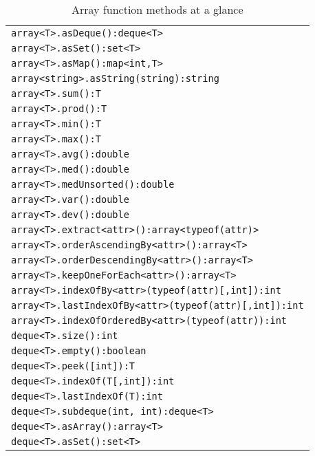 \begin{table}[htbp]
\begin{tabular}{|l|}
\texttt{array<T>.asDeque():deque<T>}\\
\texttt{array<T>.asSet():set<T>}\\
\texttt{array<T>.asMap():map<int,T>}\\
\texttt{array<string>.asString(string):string}\\
\hline
\texttt{array<T>.sum():T}\\
\texttt{array<T>.prod():T}\\
\texttt{array<T>.min():T}\\
\texttt{array<T>.max():T}\\
\texttt{array<T>.avg():double}\\
\texttt{array<T>.med():double}\\
\texttt{array<T>.medUnsorted():double}\\
\texttt{array<T>.var():double}\\
\texttt{array<T>.dev():double}\\
\hline
\texttt{array<T>.extract<attr>():array<typeof(attr)>}\\
\texttt{array<T>.orderAscendingBy<attr>():array<T>}\\
\texttt{array<T>.orderDescendingBy<attr>():array<T>}\\
\texttt{array<T>.keepOneForEach<attr>():array<T>}\\
\texttt{array<T>.indexOfBy<attr>(typeof(attr)[,int]):int}\\
\texttt{array<T>.lastIndexOfBy<attr>(typeof(attr)[,int]):int}\\
\texttt{array<T>.indexOfOrderedBy<attr>(typeof(attr)):int}\\
\hline
\texttt{deque<T>.size():int}\\
\texttt{deque<T>.empty():boolean}\\
\texttt{deque<T>.peek([int]):T}\\
\texttt{deque<T>.indexOf(T[,int]):int}\\
\texttt{deque<T>.lastIndexOf(T):int}\\
\texttt{deque<T>.subdeque(int, int):deque<T>}\\
\texttt{deque<T>.asArray():array<T>}\\
\texttt{deque<T>.asSet():set<T>}\\
\hline
\end{tabular}
\caption{Array function methods at a glance}
\end{table}

